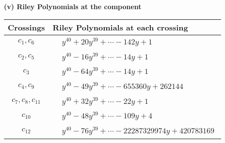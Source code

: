 \documentclass[1p]{elsarticle_modified}
\theoremstyle{definition}
\begin{document}
\flushleft \textbf{(v) Riley Polynomials at the component}\newline \\
\begin{tabular}{m{50pt}|m{274pt}}
Crossings & \hspace{64pt}Riley Polynomials at each crossing \\
\hline $$\begin{aligned}c_{1},c_{6}\end{aligned}$$&$\begin{aligned}
&y^{40}+20 y^{39}+\cdots-142 y+1
\end{aligned}$\\
\hline $$\begin{aligned}c_{2},c_{5}\end{aligned}$$&$\begin{aligned}
&y^{40}-16 y^{39}+\cdots-14 y+1
\end{aligned}$\\
\hline $$\begin{aligned}c_{3}\end{aligned}$$&$\begin{aligned}
&y^{40}-64 y^{39}+\cdots-14 y+1
\end{aligned}$\\
\hline $$\begin{aligned}c_{4},c_{9}\end{aligned}$$&$\begin{aligned}
&y^{40}-49 y^{39}+\cdots-655360 y+262144
\end{aligned}$\\
\hline $$\begin{aligned}c_{7},c_{8},c_{11}\end{aligned}$$&$\begin{aligned}
&y^{40}+32 y^{39}+\cdots-22 y+1
\end{aligned}$\\
\hline $$\begin{aligned}c_{10}\end{aligned}$$&$\begin{aligned}
&y^{40}-48 y^{39}+\cdots-109 y+4
\end{aligned}$\\
\hline $$\begin{aligned}c_{12}\end{aligned}$$&$\begin{aligned}
&y^{40}-76 y^{39}+\cdots-22287329974 y+420783169
\end{aligned}$\\
\hline
\end{tabular}\\~\\
\end{document}
